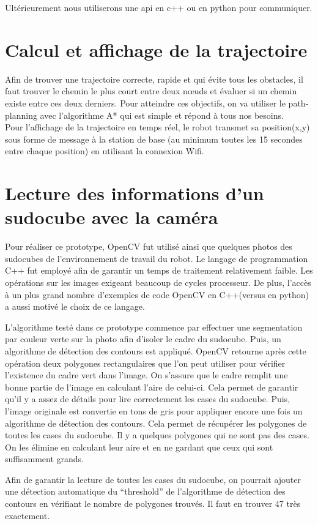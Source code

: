 Ultérieurement nous utiliserons une api en c++ ou en python pour communiquer.

\section{Calcul et affichage de la trajectoire}\label{s:traj}
Afin de trouver une trajectoire correcte, rapide et qui évite tous les obstacles, il faut trouver le chemin le plus court entre deux nœuds et évaluer si un chemin existe entre ces deux derniers.  Pour atteindre ces objectifs, on va utiliser le path-planning  avec l’algorithme A* qui est simple et répond à tous nos besoins.\\
Pour l’affichage de la trajectoire en temps réel, le robot transmet sa position(x,y) sous forme de message à la station de base (au minimum toutes les  15 secondes entre chaque position) en utilisant la connexion Wifi.

\section{Lecture des informations d'un sudocube avec la caméra}
Pour réaliser ce prototype, OpenCV fut utilisé ainsi que quelques photos des sudocubes de l’environnement de travail du robot. Le langage de programmation C++ fut employé afin de garantir un temps de traitement relativement faible. Les opérations sur les images exigeant beaucoup de cycles processeur. De plus, l'accès à un plus grand nombre d'exemples de code OpenCV en C++(versus en python) a aussi motivé le choix de ce langage.

L'algorithme testé dans ce prototype commence par effectuer une segmentation par couleur verte sur la photo afin d'isoler le cadre du sudocube. Puis, un algorithme de détection des contours est appliqué. OpenCV retourne après cette opération deux polygones rectangulaires que l'on peut utiliser pour vérifier l'existence du cadre vert dans l'image. On s'assure que le cadre remplit une bonne partie de l'image en calculant l'aire de celui-ci. Cela permet de garantir qu'il y a assez de détails pour lire correctement les cases du sudocube. Puis, l'image originale est convertie en tons de gris pour appliquer encore une fois un algorithme de détection des contours. Cela permet de récupérer les polygones de toutes les cases du sudocube. Il y a quelques polygones qui ne sont pas des cases. On les élimine en calculant leur aire et en ne gardant que ceux qui sont suffisamment grands.

Afin de garantir la lecture de toutes les cases du sudocube, on pourrait ajouter une détection automatique du “threshold” de l'algorithme de détection des contours en vérifiant le nombre de polygones trouvés. Il faut en trouver 47 très exactement.

